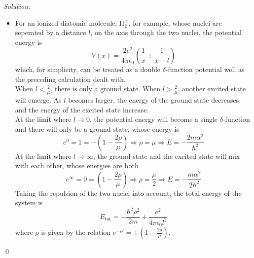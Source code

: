 \documentclass[12pt,a4paper]{article}
\newenvironment{sol}
    {\emph{Solution:}
    }
    {
    \qed
    }
\begin{document}
\begin{sol}
\begin{itemize}
\begin{itemize}
\begin{equation}
\begin{array}{ll}
Ae^{\rho x},&x<0\\
A\frac{-e^{\rho(x-l)}+e^{-\rho x}}{1-e^{-\rho l}},&0\leq x\leq l\\
-Ae^{\rho(l-x)},&x>l
\end{array}\right.
\end{equation}
Since
\begin{equation}
\varphi(l-x)=
\left\{\begin{array}{ll}
-Ae^{\rho x},&x<0\\
A\frac{-e^{-\rho x}+e^{\rho(x-l)}}{1-e^{-\rho l}},&0\leq x\leq l\\
Ae^{\rho(l-x)},&x>l
\end{array}\right.
=-\varphi(x)
\end{equation}
the excited state is odd.
\item[iii.] For an ionized diatomic molecule, H$_2^+$, for example, whose nuclei are seperated by a distance $l$, on the axis through the two nuclei, the potential energy is
\begin{equation}
V(x)=\frac{2e^2}{4\pi\epsilon_0}\left(\frac{1}{x}+\frac{1}{x-l}\right)
\end{equation}
which, for simplicity, can be treated as a double $\delta$-function potential well
as the preceding calculation dealt with.\\
When $l<\frac{2}{\mu}$, there is only a ground state. When $l>\frac{2}{\mu}$, another excited state will emerge. As $l$ becomes larger, the energy of the ground state decreases and the energy of the excited state increase.\\
At the limit where $l\rightarrow0$, the potential energy will become a single $\delta$-function and there will only be a ground state, whose energy is
\begin{equation}
e^{0}=1=-(1-\frac{2\rho}{\mu})\Longrightarrow\rho=\mu\Longrightarrow E=-\frac{2m\alpha^2}{\hbar^2}
\end{equation}
At the limit where $l\rightarrow\infty$, the ground state and the excited state will mix with each other, whose energies are both
\begin{equation}
e^{\infty}=0=(1-\frac{2\rho}{\mu})\Longrightarrow\rho=\frac{\mu}{2}\Longrightarrow E=-\frac{m\alpha^2}{2\hbar^2}
\end{equation}
Taking the repulsion of the two nuclei into account, the total energy of the system is
\begin{equation}
E_{\text{tot}}=-\frac{\hbar^2\rho^2}{2m}+\frac{e^2}{4\pi\epsilon_0l^2}
\end{equation}
where $\rho$ is given by the relation $e^{-\rho l}=\pm(1-\frac{2\rho}{\mu})$.\\

\end{itemize}
\end{itemize}
\end{sol}
\end{document}
